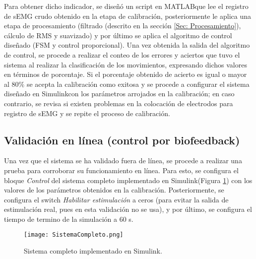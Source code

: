 Para obtener dicho indicador, se diseñó un script en MATLAB\textregistered que lee el registro de sEMG crudo obtenido en la etapa de calibración, posteriormente le aplica una etapa de procesamiento (filtrado (descrito en la sección \ref{Sec: Procesamiento}), cálculo de RMS y suavizado) y por último se aplica el algoritmo de control diseñado (FSM y control proporcional). Una vez obtenida la salida del algoritmo de control, se procede a realizar el conteo de los errores y aciertos que tuvo el sistema al realizar la clasificación de los movimientos, expresando dichos valores en términos de porcentaje. Si el porcentaje obtenido de acierto es igual o mayor al 80$\%$ se acepta la calibración como exitosa y se procede a configurar el sistema diseñado en Simulink\textregistered con los parámetros arrojados en la calibración; en caso contrario, se revisa si existen problemas en la colocación de electrodos para registro de sEMG y se repite el proceso de calibración.

\newpage
\subsection{Validación en línea (control por biofeedback)}
Una vez que el sistema se ha validado fuera de línea, se procede a realizar una prueba para corroborar su funcionamiento en línea. Para esto, se configura el bloque \emph{Control} del sistema completo implementado en Simulink\textregistered (Figura \ref{Figura: SisComp}) con los valores de los parámetros obtenidos en la calibración. Posteriormente, se configura el switch \emph{Habilitar estimulación} a ceros (para evitar la salida de estimulación real, pues en esta validación no se usa), y por último, se configura el tiempo de termino de la simulación a 60 s.

\begin{figure}[htbp]
	\centering
	\texttt{[image: SistemaCompleto.png]}
	\caption{Sistema completo implementado en Simulink\textregistered.}
	\label{Figura: SisComp}
\end{figure}

